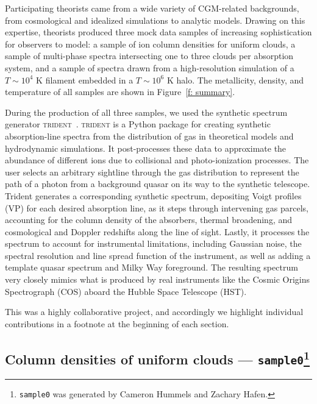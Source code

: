 \documentclass[fleqn,usenatbib]{mnras}
\begin{document}
Participating theorists came from a wide variety of CGM-related backgrounds, from cosmological and idealized simulations to analytic models.
Drawing on this expertise, theorists produced three mock data samples of increasing sophistication for observers to model:
a sample of ion column densities for uniform clouds,
a sample of multi-phase spectra intersecting one to three clouds per absorption system,
and a sample of spectra drawn from a high-resolution simulation of a $T \sim 10^4$ K filament embedded in a $T \sim 10^6$ K halo.
The metallicity, density, and temperature of all samples are shown in Figure~\ref{f: summary}.

During the production of all three samples, we used the synthetic spectrum generator \textsc{trident}~\citep{hummels2017Trident}.  \textsc{trident} is a Python package for creating synthetic absorption-line spectra from the distribution of gas in theoretical models and hydrodynamic simulations. It post-processes these data to approximate the abundance of different ions due to collisional and photo-ionization processes.  The user selects an arbitrary sightline through the gas distribution to represent the path of a photon from a background quasar on its way to the synthetic telescope.  Trident generates a corresponding synthetic spectrum, depositing Voigt profiles (VP) for each desired absorption line, as it steps through intervening gas parcels, accounting for the column density of the absorbers, thermal broadening, and cosmological and Doppler redshifts along the line of sight.  Lastly, it processes the  spectrum to account for instrumental limitations, including Gaussian noise, the spectral resolution and line spread function of the instrument, as well as adding a template quasar spectrum and Milky Way foreground.  The resulting spectrum very closely mimics what is produced by real instruments like the Cosmic Origins Spectrograph (COS) aboard the Hubble Space Telescope (HST).

This was a highly collaborative project,
and accordingly we highlight individual contributions in a footnote at the beginning of each section.

\subsection[Column densities of uniform clouds --- \texttt{sample0}]{Column densities of uniform clouds --- \texttt{sample0}\footnote{
\texttt{sample0} was generated by Cameron Hummels and Zachary Hafen.}}
\label{s: data generation -- sample0}
\end{document}
